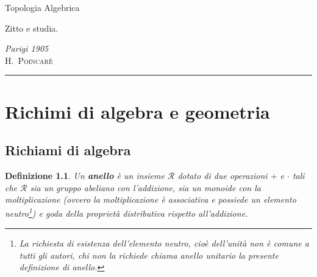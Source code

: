 \documentclass[10pt, twoside=false, x11names]{scrbook}
\newtheorem{definition}[theorem]{Definizione}
\newcommand{\R}{\mathcal{R}}
\begin{document}
\begin{titlepage}

  \noindent
  \titlefont Topologia Algebrica
  \epigraph{Zitto e studia.}%
  {\textit{Parigi 1905}\\ \textsc{H.\ Poincarè}}
  \null\vfill
  \vspace*{1cm}
  \noindent
  \hfill
  \begin{minipage}{0.35\linewidth}
    \begin{flushright}
      \printauthor
    \end{flushright}
  \end{minipage}
  \begin{minipage}{0.02\linewidth}
    \rule{1pt}{125pt}
  \end{minipage}
  \titlepagedecoration
\end{titlepage}

\tableofcontents
{}
\printsymblist


\chapter{Richimi di algebra e geometria}
\section{Richiami di algebra}

\newmathsymb{R}{\R}{Anello}
\begin{definition}
  Un \textbf{anello}  è un insieme $ \R $ dotato di due operazioni $ + $ e $ \cdot $ tali che
  $ \R $ sia un gruppo abeliano con l'addizione, sia un monoide con la moltiplicazione
  (ovvero la moltiplicazione è associativa e possiede un elemento neutro\footnote{La richiesta
    di esistenza dell'elemento neutro, cioè dell'unità non è comune a tutti gli autori,
    chi non la richiede chiama anello unitario  la presente
    definizione di anello.}) e goda della proprietà distributiva rispetto all'addizione.
\end{definition}
\end{document}
